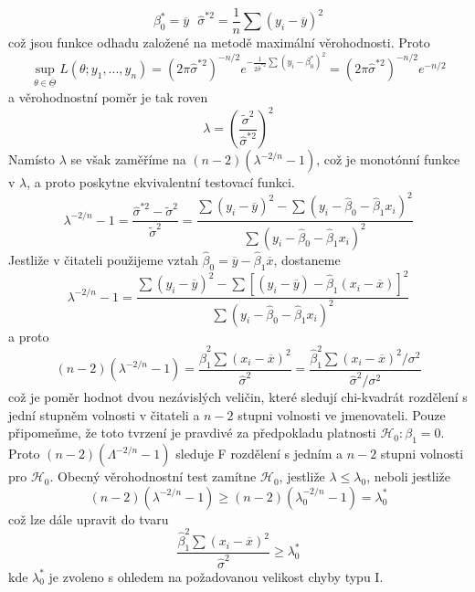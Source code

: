 \begin{equation*}
\beta_0^* = \overline{y} ~~~ \hat{\sigma}^{*2} = \frac{1}{n}\sum(y_i - \overline{y})^2
\end{equation*}
což jsou funkce odhadu založené na metodě maximální věrohodnosti. Proto
\begin{equation*}
\sup_{\theta \in \overline{\underline{\Theta}}} L(\theta; y_1, ..., y_n) = (2 \pi\hat{\sigma}^{*2})^{-n/2}e^{-\frac{1}{2\hat{\sigma}^{*2}}\sum(y_i - \beta_0^*)^2} = (2 \pi\hat{\sigma}^{*2})^{-n/2}e^{-n/2}
\end{equation*}
a věrohodnostní poměr je tak roven
\begin{equation*}
\lambda = \left(\frac{\tilde{\sigma}^2}{\hat{\sigma}^{*2}}\right)^2
\end{equation*}
Namísto $\lambda$ se však zaměříme na $(n - 2)(\lambda^{-2/n} - 1)$, což je monotónní funkce v $\lambda$, a proto poskytne ekvivalentní testovací funkci.
\begin{equation*}
\lambda^{-2/n} - 1 = \frac{\hat{\sigma}^{*2} - \tilde{\sigma}^2}{\tilde{\sigma}^2} = \frac{\sum (y_i - \overline{y})^2 - \sum (y_i - \hat{\beta}_0 - \hat{\beta}_1 x_i)^2}{\sum (y_i - \hat{\beta}_0 - \hat{\beta}_1 x_i)^2}
\end{equation*}
Jestliže v čitateli použijeme vztah $\hat{\beta}_0 = \overline{y} - \hat{\beta}_1 \overline{x}$, dostaneme
\begin{equation*}
\lambda^{-2/n} - 1 = \frac{\sum(y_i - \overline{y})^2 - \sum[(y_i - \overline{y}) - \hat{\beta}_1(x_i - \overline{x})]^2}{\sum(y_i - \hat{\beta}_0 - \hat{\beta}_1 x_i)^2}
\end{equation*}
a proto
\begin{equation*}
(n - 2)(\lambda^{-2/n} - 1) = \frac{\hat{\beta}_1^2 \sum(x_i - \overline{x})^2}{\hat{\sigma}^2} = \frac{\hat{\beta}_1^2\sum(x_i - \overline{x})^2/\sigma^2}{\hat{\sigma}^2/\sigma^2}
\end{equation*}
což je poměr hodnot dvou nezávislých veličin, které sledují chi-kvadrát rozdělení s jední stupněm volnosti v čitateli a $n - 2$ stupni volnosti ve jmenovateli. Pouze připomeňme, že toto tvrzení je pravdivé za předpokladu platnosti $\mathscr{H}_0: \beta_1 = 0$. Proto $(n - 2)(\Lambda^{-2/n} - 1)$ sleduje F rozdělení s jedním a $n - 2$ stupni volnosti pro $\mathscr{H}_0$. Obecný věrohodnostní test zamítne $\mathscr{H}_0$, jestliže $\lambda \le \lambda_0$, neboli jestliže
\begin{equation*}
(n - 2)(\lambda^{-2/n} - 1) \ge (n - 2)(\lambda_0^{-2/n} - 1) = \lambda_0^*
\end{equation*}
což lze dále upravit do tvaru
\begin{equation*}
\frac{\hat{\beta}_1^2 \sum(x_i - \overline{x})^2}{\hat{\sigma}^2} \ge \lambda_0^*
\end{equation*}
kde $\lambda_0^*$ je zvoleno s ohledem na požadovanou velikost chyby typu I.


